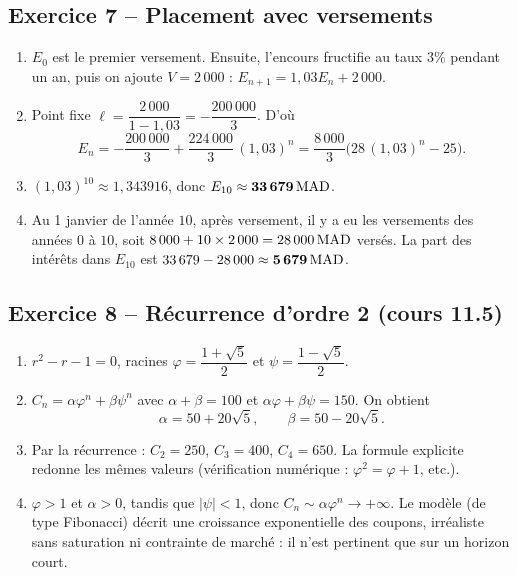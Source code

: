 \documentclass[11pt,a4paper]{article}
\begin{document}
\subsection{Exercice 7 -- Placement avec versements}

\begin{enumerate}
  \item $E_0$ est le premier versement. Ensuite, l'encours fructifie au taux $3\%$ pendant un an, puis on ajoute $V=2\,000$ : $E_{n+1}=1{,}03 E_n+2\,000$.

  \item Point fixe $\ell=\dfrac{2\,000}{1-1{,}03}=-\dfrac{200\,000}{3}$. D'où
  \[
  E_n = -\dfrac{200\,000}{3} + \dfrac{224\,000}{3}\,(1{,}03)^n = \dfrac{8\,000}{3}\bigl(28\,(1{,}03)^n-25\bigr).
  \]

  \item $(1{,}03)^{10}\approx 1{,}343916$, donc $E_{10}\approx \mathbf{33\,679\,\mathrm{MAD}}$.

  \item Au 1 janvier de l'année $10$, après versement, il y a eu les versements des années $0$ à $10$, soit $8\,000+10\times 2\,000=28\,000\,\mathrm{MAD}$ versés. La part des intérêts dans $E_{10}$ est $33\,679-28\,000\approx \mathbf{5\,679\,\mathrm{MAD}}$.
\end{enumerate}

\subsection{Exercice 8 -- Récurrence d'ordre 2 (cours 11.5)}

\begin{enumerate}
  \item $r^2-r-1=0$, racines $\varphi=\dfrac{1+\sqrt{5}}{2}$ et $\psi=\dfrac{1-\sqrt{5}}{2}$.
  \item $C_n=\alpha\varphi^n+\beta\psi^n$ avec $\alpha+\beta=100$ et $\alpha\varphi+\beta\psi=150$. On obtient
  \[
  \alpha = 50+20\sqrt{5}, \qquad \beta = 50-20\sqrt{5}.
  \]
  \item Par la récurrence : $C_2=250$, $C_3=400$, $C_4=650$. La formule explicite redonne les mêmes valeurs (vérification numérique : $\varphi^2=\varphi+1$, etc.).
  \item $\varphi>1$ et $\alpha>0$, tandis que $\lvert\psi\rvert<1$, donc $C_n\sim \alpha\varphi^n \to +\infty$. Le modèle (de type Fibonacci) décrit une croissance exponentielle des coupons, irréaliste sans saturation ni contrainte de marché : il n'est pertinent que sur un horizon court.
\end{enumerate}
\end{document}
